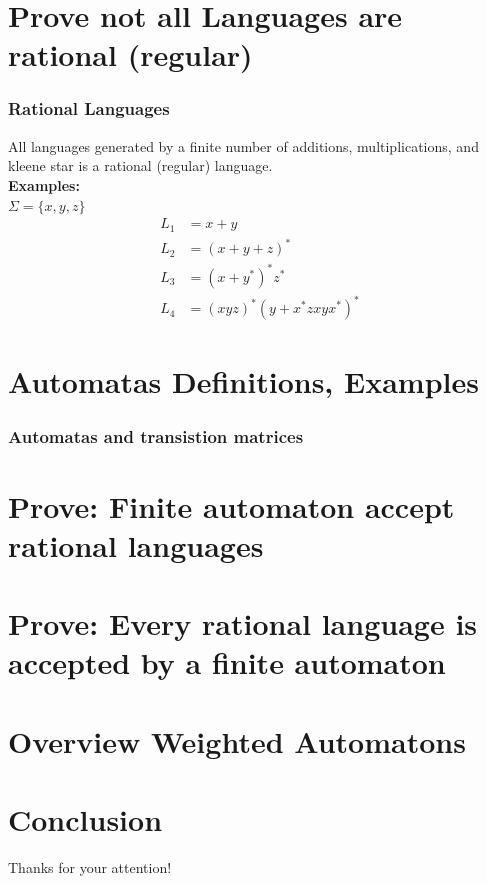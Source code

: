 \documentclass{beamer}
\begin{document}
\section{Prove not all Languages are rational (regular)}
\begin{frame}
  \frametitle{Rational Languages}
  All languages generated by a finite number of additions, multiplications, 
  and kleene star is a rational (regular) language.\\
  {\bf Examples:}\\
  $\Sigma = \{x, y, z\}$ 
  \begin{align}
    L_1 &= x+y \\
    L_2 &=(x+y+z)^* \\
    L_3 &= (x+y^*)^*z^*\\
    L_4 &=(xyz)^*(y+x^*zxyx^*)^*
  \end{align}
\end{frame}
\section{Automatas Definitions, Examples}
\begin{frame}[fragile]
  \frametitle{Automatas and transistion matrices}
  \begin{center}
  \end{center}
\end{frame}
\section{Prove: Finite automaton accept rational languages}
\section{Prove: Every rational language is accepted by a finite automaton}
\section{Overview Weighted Automatons}
\section{Conclusion}




\begin{frame}
    \Huge{\centerline{Thanks for your attention!}}
    
\end{frame}





\end{document}
